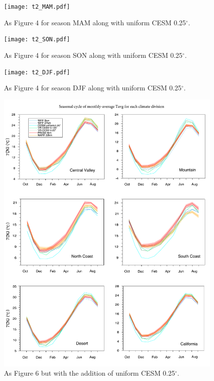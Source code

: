 \documentclass[ms]{agutexSI}
\begin{document}
\begin{figure}
\begin{center}
\texttt{[image: t2\_MAM.pdf]}
\caption{As Figure 4 for season MAM along with uniform CESM 0.25$^\circ$.}
\end{center}
\end{figure}

\begin{figure}
\begin{center}
\texttt{[image: t2\_SON.pdf]}
\caption{As Figure 4 for season SON along with uniform CESM 0.25$^\circ$.}
\end{center}
\end{figure}

\begin{figure}
\begin{center}
\texttt{[image: t2\_DJF.pdf]}
\caption{As Figure 4 for season DJF along with uniform CESM 0.25$^\circ$.}
\end{center}
\end{figure}

\begin{figure}
\begin{center}
\includegraphics[width=6in]{trd_t2avg_allzones_with_uniform_CESM.pdf}
\caption{As Figure 6 but with the addition of uniform CESM 0.25$^\circ$.}
\end{center}
\end{figure}
\end{document}
